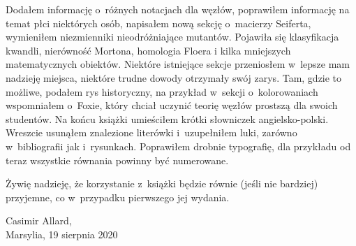 Dodałem informację o~różnych notacjach dla węzłów, poprawiłem informację na temat płci niektórych osób, napisałem nową sekcję o~macierzy Seiferta, wymieniłem niezmienniki nieodróżniające mutantów.
Pojawiła się klasyfikacja kwandli, nierówność Mortona, homologia Floera i kilka mniejszych matematycznych obiektów.
%
Niektóre istniejące sekcje przeniosłem w~lepsze mam nadzieję miejsca, niektóre trudne dowody otrzymały swój zarys.
Tam, gdzie to możliwe, podałem rys historyczny, na przykład w~sekcji o~kolorowaniach wspomniałem o~Foxie, który chciał uczynić teorię węzłów prostszą dla swoich studentów.
Na końcu książki umieściłem krótki słowniczek angielsko-polski.
Wreszcie usunąłem znalezione literówki i~uzupełniłem luki, zarówno w~bibliografii jak i~rysunkach.
Poprawiłem drobnie typografię, dla przykładu od teraz wszystkie równania powinny być numerowane.

Żywię nadzieję, że korzystanie z~książki będzie równie (jeśli nie bardziej) przyjemne, co w~przypadku pierwszego jej wydania.

\begin{flushright}
Casimir Allard,\\Marsylia, 19 sierpnia 2020
\end{flushright}

